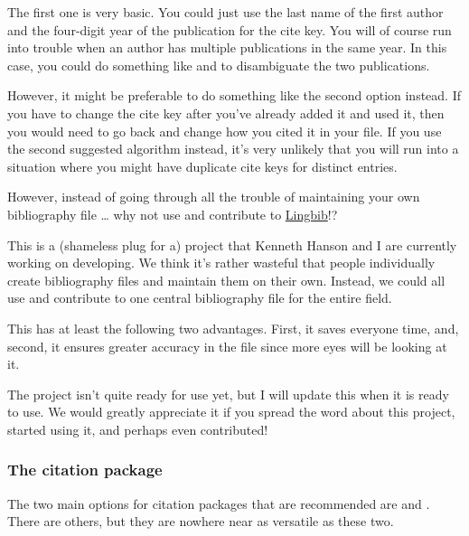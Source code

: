 The first one is very basic.
You could just use the last name of the first author and the four-digit year of the publication for the cite key.
You will of course run into trouble when an author has multiple publications in the same year.
In this case, you could do something like  and  to disambiguate the two publications.

However, it might be preferable to do something like the second option instead.
If you have to change the cite key after you've already added it and used it, then you would need to go back and change how you cited it in your  file.
If you use the second suggested algorithm instead, it's very unlikely that you will run into a situation where you might have duplicate cite keys for distinct entries.

\label{subsubsubsec:lingbib}

However, instead of going through all the trouble of maintaining your own bibliography file \ldots{} why not use and contribute to \href{https://github.com/lingbib/lingbib}{Lingbib}!?

This is a (shameless plug for a) project that Kenneth Hanson and I are currently working on developing.
We think it's rather wasteful that people individually create bibliography files and maintain them on their own.
Instead, we could all use and contribute to one central bibliography file for the entire field.

This has at least the following two advantages. First, it saves everyone time, and, second, it ensures greater accuracy in the  file since more eyes will be looking at it.

The project isn't quite ready for use yet, but I will update this  when it is ready to use.
We would greatly appreciate it if you spread the word about this project, started using it, and perhaps even contributed! \ASCIIEmoji{:)}

\subsubsection{The citation package}
\label{subsubsec:the-citation-package}

The two main options for citation packages that are recommended are  and .
There are others, but they are nowhere near as versatile as these two.

\label{subsubsubsec:natbib}

